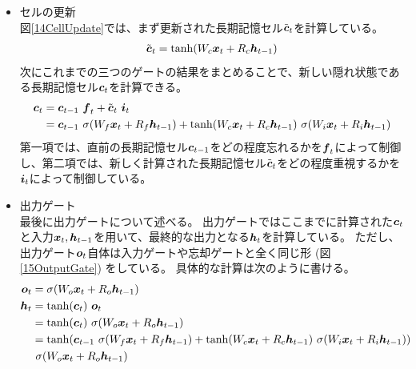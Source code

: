 \begin{itemize}
  \item セルの更新\\
  図\ref{14CellUpdate}では、まず更新された長期記憶セル$\tilde{{\mbox{\boldmath{$c$}}}}_t$を計算している。
\begin{equation}
 \begin{split}
  \tilde{{\mbox{\boldmath{$c$}}}}_t = \tanh (W_c {\mbox{\boldmath{$x$}}}_t + R_c {\mbox{\boldmath{$h$}}}_{t-1})
 \end{split}
\end{equation} 
  次にこれまでの三つのゲートの結果をまとめることで、新しい隠れ状態である長期記憶セル${\mbox{\boldmath{$c$}}}_{t}$を計算できる。
\begin{equation}
 \begin{split}
  {\mbox{\boldmath{$c$}}}_{t} 
  &= {\mbox{\boldmath{$c$}}}_{t-1} \  {\mbox{\boldmath{$f$}}}_{t} + \tilde{\mbox{\boldmath{$c$}}}_{t}\ {\mbox{\boldmath{$i$}}}_{t}\\
  &= {\mbox{\boldmath{$c$}}}_{t-1} \  \sigma (W_f {\mbox{\boldmath{$x$}}}_t + R_f {\mbox{\boldmath{$h$}}}_{t-1}) 
  + \tanh (W_c {\mbox{\boldmath{$x$}}}_t + R_c {\mbox{\boldmath{$h$}}}_{t-1}) \  \sigma (W_i {\mbox{\boldmath{$x$}}}_t + R_i {\mbox{\boldmath{$h$}}}_{t-1})
 \end{split}
\end{equation}
  第一項では、直前の長期記憶セル${\mbox{\boldmath{$c$}}}_{t-1}$をどの程度忘れるかを${\mbox{\boldmath{$f$}}}_{t}$によって制御し、第二項では、新しく計算された長期記憶セル$\tilde{\mbox{\boldmath{$c$}}}_{t}$をどの程度重視するかを${\mbox{\boldmath{$i$}}}_{t}$によって制御している。
    
  \item 出力ゲート\\
  最後に出力ゲートについて述べる。
  出力ゲートではここまでに計算された${\mbox{\boldmath{$c$}}}_{t}$と入力${\mbox{\boldmath{$x$}}}_t, {\mbox{\boldmath{$h$}}}_{t-1}$を用いて、最終的な出力となる${\mbox{\boldmath{$h$}}}_{t}$を計算している。
  ただし、出力ゲート${\mbox{\boldmath{$o$}}}_{t}$自体は入力ゲートや忘却ゲートと全く同じ形 (図\ref{15OutputGate}) をしている。
  具体的な計算は次のように書ける。
\begin{equation}
 \begin{split}
  {\mbox{\boldmath{$o$}}}_{t} 
  &= \sigma (W_o {\mbox{\boldmath{$x$}}}_t + R_o {\mbox{\boldmath{$h$}}}_{t-1})\\
  {\mbox{\boldmath{$h$}}}_{t} 
  &= \tanh({\mbox{\boldmath{$c$}}}_{t}) \  {\mbox{\boldmath{$o$}}}_{t}\\
  &= \tanh({\mbox{\boldmath{$c$}}}_{t}) \  \sigma (W_o {\mbox{\boldmath{$x$}}}_t + R_o {\mbox{\boldmath{$h$}}}_{t-1})\\
  &= \tanh({\mbox{\boldmath{$c$}}}_{t-1} \  \sigma (W_f {\mbox{\boldmath{$x$}}}_t + R_f {\mbox{\boldmath{$h$}}}_{t-1}) 
  + \tanh (W_c {\mbox{\boldmath{$x$}}}_t + R_c {\mbox{\boldmath{$h$}}}_{t-1}) \  \sigma (W_i {\mbox{\boldmath{$x$}}}_t + R_i {\mbox{\boldmath{$h$}}}_{t-1})) \\
  &\  \sigma (W_o {\mbox{\boldmath{$x$}}}_t + R_o {\mbox{\boldmath{$h$}}}_{t-1})
 \end{split}
\end{equation}
\end{itemize}


